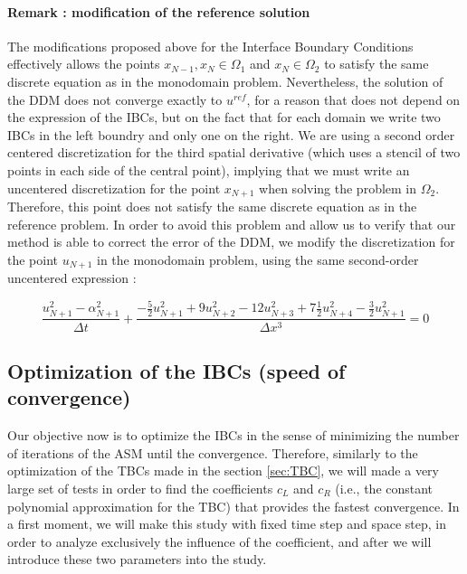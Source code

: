 \paragraph{Remark : modification of the reference solution}

\indent The modifications proposed above for the Interface Boundary Conditions effectively allows the points $x_{N-1},x_N \in \Omega_1$ and $x_N \in \Omega_2$ to satisfy the same discrete equation as in the monodomain problem. Nevertheless, the solution of the DDM does not converge exactly to $u^{ref}$, for a reason that does not depend on the expression of the IBCs, but on the fact that for each domain we write two IBCs in the left boundry and only one on the right. We are using a second order centered discretization for the third spatial derivative (which uses a stencil of two points in each side of the central point), implying that we must write an uncentered discretization for the point $x_{N+1}$ when solving the problem in $\Omega_2$. Therefore, this point does not satisfy the same discrete equation as in the reference problem. In order to avoid this problem and allow us to verify that our method is able to correct the error of the DDM, we modify the discretization for the point $u_{N+1}$ in the monodomain problem, using the same second-order uncentered expression :

\begin{equation}
    \label{eq:uncenteredFDdiscretizationN}
    \frac{u_{N+1}^2 - \alpha_{N+1}^2}{\Delta t} + \frac{-\frac{5}{2}u_{N+1}^2 + 9u_{N+2}^2 - 12 u_{N+3}^2 + 7\frac{1}{2}u_{N+4}^2 -\frac{3}{2}u_{N+1}^2}{\Delta x ^3} = 0
\end{equation}

\subsection{Optimization of the IBCs (speed of convergence)}

\indent Our objective now is to optimize the IBCs in the sense of minimizing the number of iterations of the ASM until the convergence. Therefore, similarly to the optimization of the TBCs made in the section \ref{sec:TBC}, we will made a very large set of tests in order to find the coefficients $c_L$ and $c_R$ (i.e., the constant polynomial approximation for the TBC) that provides the fastest convergence. In a first moment, we will make this study with fixed time step and space step, in order to analyze exclusively the influence of the coefficient, and after we will introduce these two parameters into the study.

